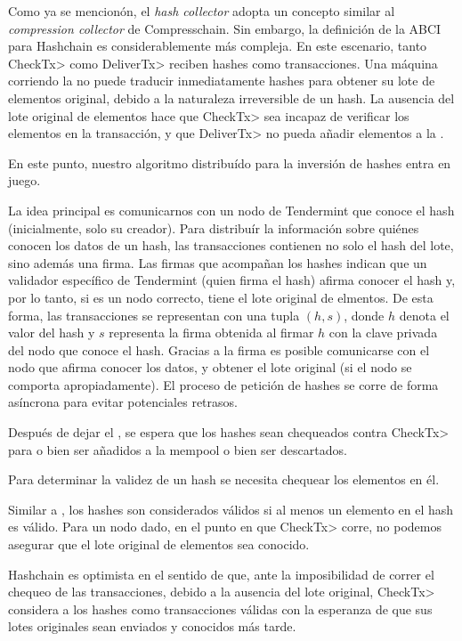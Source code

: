 Como ya se mencionón, el \textit{hash collector} adopta un concepto similar al \textit{compression collector}
de Compresschain. Sin embargo, la definición de la ABCI para Hashchain es considerablemente más compleja.
%
En este escenario, tanto \<CheckTx> como \<DeliverTx> reciben hashes como transacciones.
%
Una máquina corriendo la \setchain no puede traducir inmediatamente hashes para obtener su lote de elementos
original, debido a la naturaleza irreversible de un hash.
%
La ausencia del lote original de elementos hace que \<CheckTx> sea incapaz de verificar los elementos
en la transacción, y que \<DeliverTx> no pueda añadir elementos a la \setchain.
%

En este punto, nuestro algoritmo distribuído para la inversión de hashes entra en juego.
%

La idea principal es comunicarnos con un nodo de Tendermint que conoce el hash (inicialmente, solo su creador).
%
Para distribuír la información sobre quiénes conocen los datos de un hash, las transacciones contienen
no solo el hash del lote, sino además una firma.
%
Las firmas que acompañan los hashes indican que un validador específico de Tendermint
(quien firma el hash) afirma conocer el hash y, por lo tanto, si es un nodo correcto,
tiene el lote original de elmentos.
%
De esta forma, las transacciones se representan con una tupla $(h, s)$, donde $h$ denota
el valor del hash y $s$ representa la firma obtenida al firmar $h$ con la clave privada
del nodo que conoce el hash.
%
Gracias a la firma es posible comunicarse con el nodo que afirma conocer los datos, y obtener
el lote original (si el nodo se comporta apropiadamente).
%
El proceso de petición de hashes se corre de forma asíncrona para evitar potenciales
retrasos.

%
Después de dejar el \collector, se espera que los hashes sean chequeados contra \<CheckTx>
para o bien ser añadidos a la mempool o bien ser descartados.

%
Para determinar la validez de un hash se necesita chequear los elementos en él.

%
Similar a \compresschain, los hashes son considerados válidos si al menos un elemento
en el hash es válido.
%
Para un nodo dado, en el punto en que \<CheckTx> corre, no podemos asegurar que el
lote original de elementos sea conocido.

%
Hashchain es optimista en el sentido de que, ante la imposibilidad de correr el chequeo
de las transacciones, debido a la ausencia del lote original, \<CheckTx> considera a los
hashes como transacciones válidas con la esperanza de que sus lotes originales sean enviados
y conocidos más tarde. 

